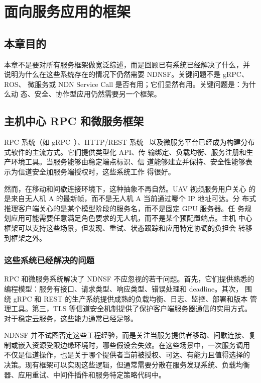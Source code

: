 \chapter{面向服务应用的框架}
\label{chap:soa-ch}

\section{本章目的}

本章不是要对所有服务框架做宽泛综述，而是回顾已有系统已经解决了什么，并
说明为什么在这些系统存在的情况下仍然需要 NDNSF。关键问题不是 gRPC、ROS、
微服务或 NDN Service Call 是否有用；它们显然有用。关键问题是：为什么动
态、安全、协作型应用仍然需要另一个框架。

\section{主机中心 RPC 和微服务框架}

RPC 系统（如 gRPC~\cite{grpc}）、HTTP/REST 系统~\cite{fielding2000rest}
以及微服务平台已经成为构建分布式软件的主流方式。它们提供类型化 API、传
输绑定、负载均衡、服务注册和生产环境工具。当服务能够由稳定端点标识、信
道能够建立并保持、安全性能够表示为信道安全加服务端授权时，这些系统工作
得很好。

然而，在移动和间歇连接环境下，这种抽象不再自然。UAV 视频服务用户关心
的是来自无人机 A 的最新帧，而不是无人机 A 当前通过哪个 IP 地址可达。分
布式推理客户端关心的是某个模型阶段的服务名，而不是固定 GPU 服务器。任
务规划应用可能需要任意满足角色要求的无人机，而不是某个预配置端点。主机
中心框架可以支持这些场景，但发现、重试、状态跟踪和应用特定协调的负担会
转移到框架之外。

\subsection{这些系统已经解决的问题}

RPC 和微服务系统解决了 NDNSF 不应忽视的若干问题。首先，它们提供熟悉的
编程模型：服务有接口、请求类型、响应类型、错误处理和 deadline。其次，
围绕 gRPC 和 REST 的生产系统提供成熟的负载均衡、日志、监控、部署和版本
管理工具。第三，TLS 等信道安全机制提供了保护客户端服务器通信的实用方式。
对于稳定云服务，这些能力通常已经足够。

NDNSF 并不试图否定这些工程经验，而是关注当服务提供者移动、间歇连接、复
制或嵌入资源受限边缘环境时，哪些假设会失效。在这些场景中，一次服务调用
不仅是信道操作，也是关于哪个提供者当前被授权、可达、有能力且值得选择的
决策。现有框架可以实现这些逻辑，但通常需要分散在服务发现系统、负载均衡
器、应用重试、中间件插件和服务特定策略代码中。

